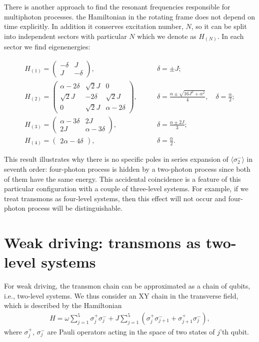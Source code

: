 \documentclass[%
 aps, pra,
 amsmath,amssymb,
 preprint,%
superscriptaddress
]{revtex4-2}
\begin{document}
There is another approach to find the resonant frequencies responsible for multiphoton processes. 
the Hamiltonian in the rotating frame does not depend on time explicitly. In addition it conserves excitation number, $N$, so it can be split into independent sectors with particular $N$ which we denote as $H_{(N)}$.
In each sector we find eigenenergies:
\begin{widetext}
$$
\begin{array}{ccc}
H_{(1)} = \begin{pmatrix}
-\delta & J
\\
J & -\delta
\end{pmatrix},
\qquad &
\delta = \pm J;
\\[1em]
H_{(2)} = \begin{pmatrix}
\alpha - 2\delta & \sqrt{2} J & 0
\\
\sqrt{2} J & - 2\delta & \sqrt{2} J
\\
0 & \sqrt{2} J & \alpha - 2 \delta
\end{pmatrix},
\qquad &
\displaystyle
\delta = \frac{\alpha \pm \sqrt{16 J^2 + \alpha^2}}{4}, \quad \delta = \frac{\alpha}{2};
\\[2em]
H_{(3)} = \begin{pmatrix}
\alpha - 3\delta & 2J
\\
2 J & \alpha - 3 \delta
\end{pmatrix},
\qquad & \displaystyle
\delta = \frac{\alpha \pm 2 J}{3};
\\[2em]
H_{(4)} = \begin{pmatrix}
2 \alpha - 4\delta
\end{pmatrix},
\qquad & \displaystyle
\delta = \frac{\alpha}{2}.
\end{array}
$$
\end{widetext}
This result illustrates why there is no specific poles in series expansion of $\langle\sigma_{2}^-\rangle$ in seventh order: four-photon process is hidden by a two-photon process since both of them have the same energy. This accidental coincidence is a feature of this particular configuration with a couple of three-level systems. For example, if we treat transmons as  four-level systems, then this effect will not occur and four-photon process will be distinguishable.


\section{Weak driving: transmons as two-level systems}

For weak driving, the transmon chain can be approximated as a chain of qubits, i.e.,
two-level systems. We thus consider an XY chain in the transverse field, which is described
by the Hamiltonian
\begin{eqnarray}
H = \omega \sum_{j=1}^{5} \sigma_j^{+} \sigma_j^{-} + J
\sum_{j=1}^{5}(\sigma_j^{+} \sigma_{j+1}^{-} + \sigma_{j+1}^{+}
\sigma_j^{-}),
\label{Hamiltonian}
\end{eqnarray}
where $\sigma_j^{+}$, $\sigma_j^{-}$ are Pauli operators acting in the space of two states of $j$'th qubit.
\end{document}
